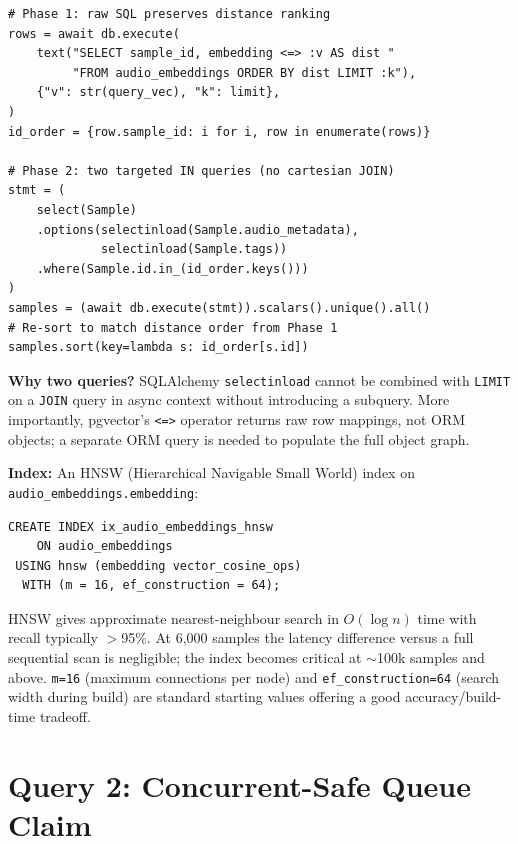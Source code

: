 \documentclass[12pt,letterpaper]{report}
\begin{document}
\begin{lstlisting}[style=pythonstyle,
  caption={Phase 2 --- ORM hydration with selectinload, preserving distance order},
  label={lst:vec-orm}]
# Phase 1: raw SQL preserves distance ranking
rows = await db.execute(
    text("SELECT sample_id, embedding <=> :v AS dist "
         "FROM audio_embeddings ORDER BY dist LIMIT :k"),
    {"v": str(query_vec), "k": limit},
)
id_order = {row.sample_id: i for i, row in enumerate(rows)}

# Phase 2: two targeted IN queries (no cartesian JOIN)
stmt = (
    select(Sample)
    .options(selectinload(Sample.audio_metadata),
             selectinload(Sample.tags))
    .where(Sample.id.in_(id_order.keys()))
)
samples = (await db.execute(stmt)).scalars().unique().all()
# Re-sort to match distance order from Phase 1
samples.sort(key=lambda s: id_order[s.id])
\end{lstlisting}

\textbf{Why two queries?} SQLAlchemy \texttt{selectinload} cannot be combined with \texttt{LIMIT} on a \texttt{JOIN} query in async context without introducing a subquery. More importantly, pgvector's \texttt{<=>} operator returns raw row mappings, not ORM objects; a separate ORM query is needed to populate the full object graph.

\textbf{Index:} An HNSW (Hierarchical Navigable Small World) index on \texttt{audio\_embeddings.embedding}:

\begin{lstlisting}[style=sqlstyle,
  caption={HNSW index for approximate nearest-neighbour cosine search},
  label={lst:hnsw}]
CREATE INDEX ix_audio_embeddings_hnsw
    ON audio_embeddings
 USING hnsw (embedding vector_cosine_ops)
  WITH (m = 16, ef_construction = 64);
\end{lstlisting}

HNSW gives approximate nearest-neighbour search in $O(\log n)$ time with recall typically $>$95\%. At 6{,}000 samples the latency difference versus a full sequential scan is negligible; the index becomes critical at $\sim$100k samples and above. \texttt{m=16} (maximum connections per node) and \texttt{ef\_construction=64} (search width during build) are standard starting values offering a good accuracy/build-time tradeoff.

\section{Query 2: Concurrent-Safe Queue Claim}
\end{document}

